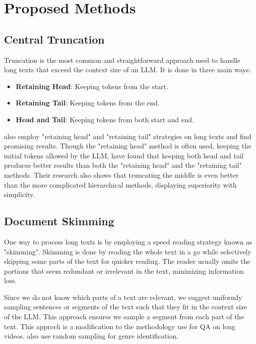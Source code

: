 \section{Proposed Methods}
\label{sec:methodology}

\subsection{Central Truncation}
\label{method:truncation}

Truncation is the most common and straightforward approach used to handle long texts
that exceed the context size of an LLM.
It is done in three main ways:

\begin{itemize}
	\item \textbf{Retaining Head}: Keeping tokens from the start.
	\item \textbf{Retaining Tail}: Keeping tokens from the end.
	\item \textbf{Head and Tail}: Keeping tokens from both start and end.
\end{itemize}

\citet{worsham-kalita-2018-genre} also employ "retaining head" and "retaining tail"
strategies on long texts and find promising results.
Though the "retaining head" method is often used, keeping the initial tokens allowed
by the LLM, \citet{sun2019fine} have found that keeping both head and tail produces
better results than both the "retaining head" and the "retaining tail" methods.
Their research also shows that truncating the middle is even better than the more
complicated hierarchical methods, displaying superiority with simplicity.


\subsection{Document Skimming}
\label{method:skimming}

One way to process long texts is by employing a speed reading strategy known as
"skimming".
Skimming is done by reading the whole text in a go while selectively skipping some
parts of the text for quicker reading.
The reader usually omits the portions that seem redundant or irrelevant in the text,
minimizing information loss.

Since we do not know which parts of a text are relevant, we suggest uniformly sampling
sentences or segments of the text such that they fit in the context size of the LLM.
This approach ensures we sample a segment from each part of the text.
This approch is a modification to the methodology \citet{wang2024videoagent} use for
QA on long videos. \citet{worsham-kalita-2018-genre} also use random sampling for genre
identification.


